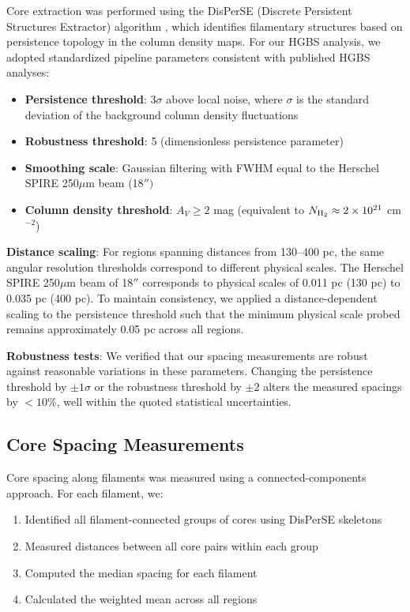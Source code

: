 \documentclass[11pt,a4paper]{article}
\begin{document}
Core extraction was performed using the DisPerSE (Discrete Persistent Structures Extractor) algorithm \citep{Sousbie2011}, which identifies filamentary structures based on persistence topology in the column density maps. For our HGBS analysis, we adopted standardized pipeline parameters consistent with published HGBS analyses:

\begin{itemize}
    \item \textbf{Persistence threshold}: $3\sigma$ above local noise, where $\sigma$ is the standard deviation of the background column density fluctuations
    \item \textbf{Robustness threshold}: 5 (dimensionless persistence parameter)
    \item \textbf{Smoothing scale}: Gaussian filtering with FWHM equal to the Herschel SPIRE 250$\mu$m beam (18$'')$
    \item \textbf{Column density threshold}: $A_V \geq 2$ mag (equivalent to $N_{\rm H_2} \approx 2 \times 10^{21}$ cm$^{-2}$)
\end{itemize}

\textbf{Distance scaling}: For regions spanning distances from 130--400 pc, the same angular resolution thresholds correspond to different physical scales. The Herschel SPIRE 250$\mu$m beam of 18$''$ corresponds to physical scales of 0.011 pc (130 pc) to 0.035 pc (400 pc). To maintain consistency, we applied a distance-dependent scaling to the persistence threshold such that the minimum physical scale probed remains approximately 0.05 pc across all regions.

\textbf{Robustness tests}: We verified that our spacing measurements are robust against reasonable variations in these parameters. Changing the persistence threshold by $\pm 1\sigma$ or the robustness threshold by $\pm 2$ alters the measured spacings by $<10$\%, well within the quoted statistical uncertainties.

\subsection{Core Spacing Measurements}

Core spacing along filaments was measured using a connected-components approach. For each filament, we:
\begin{enumerate}
    \item Identified all filament-connected groups of cores using DisPerSE skeletons
    \item Measured distances between all core pairs within each group
    \item Computed the median spacing for each filament
    \item Calculated the weighted mean across all regions
\end{enumerate}
\end{document}
